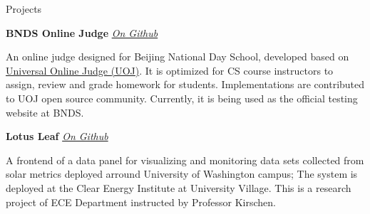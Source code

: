 \documentclass{resume}
\begin{document}
	\begin{rSection}{Projects}
	
		\textbf{BNDS Online Judge} \hfill {\em {\href{https://github.com/AD1024/BNDSOJ}{On Github}}}
		\vspace{-5pt}

		An online judge designed for Beijing National Day School, developed based on \href{https://github.com/vfleaking/uoj}{Universal Online Judge (UOJ)}. It is optimized for CS course instructors to assign, review and grade homework for students. Implementations are contributed to UOJ open source community. Currently, it is being used as the official testing website at BNDS.
		\vspace{-5pt}



		\textbf{Lotus Leaf} \hfill {\em {\href{https://github.com/AD1024/lotus-leaf-frontend}{On Github}}}
		\vspace{-5pt}

		A frontend of a data panel for visualizing and monitoring data sets collected from solar metrics deployed arround University of Washington campus; The system is deployed at the Clear Energy Institute at University Village. This is a research project of ECE Department instructed by Professor Kirschen.

	\end{rSection}
	\vspace{-5pt}
	
\end{document}
